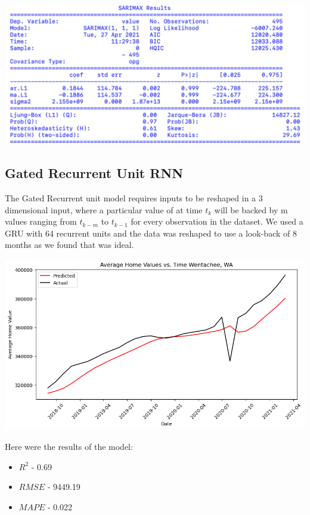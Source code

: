 \documentclass{article}
\begin{document}
	\includegraphics[scale = 0.2]{../plots/2018/zillow2018_SARIMA_stats2.png} \\
	\subsection{Gated Recurrent Unit RNN}
	
	The Gated Recurrent unit model requires inputs to be reshaped in a 3 dimensional input, where a particular value of at time $t_k$ 
	will be backed by m values ranging from $t_{k-m}$ to $t_{k-1}$ for every observation in the dataset. We used a GRU with 64 recurrent units 
	and the data was reshaped to use a look-back of 8 months as we found that was ideal. 
	
	\includegraphics[scale = 0.5]{../plots/wentachee_1d_gru.png}
	
	Here were the results of the model: 
	
	\begin{itemize}
		\item $R^2$ - 0.69
		\item $RMSE$ - 9449.19
		\item $MAPE$ - 0.022
	\end{itemize}
\end{document}
